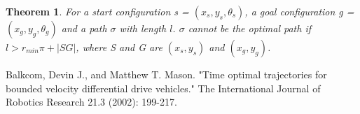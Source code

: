 \documentclass[12pt]{article}
\newtheorem{theorem}{Theorem}[section]
\begin{document}
  
  
  \begin{theorem}
  	For a start configuration s = $(x_{s},y_{s},\theta_{s})$, a goal configuration g = $(x_{g},y_{g},\theta_{g})$ and a path $\sigma$ with length $l$. $\sigma$ cannot be the optimal path if $l > r_{min}\pi + |SG|$, where S and G are $(x_{s}, y_{s})$ and $(x_{g}, y_{g})$.
  \end{theorem} 
  
  
  
  
  
  \begin{thebibliography}{1}

   Balkcom, Devin J., and Matthew T. Mason. "Time optimal trajectories for bounded velocity differential drive vehicles." The International Journal of Robotics Research 21.3 (2002): 199-217.

  \end{thebibliography}
  
\end{document}
